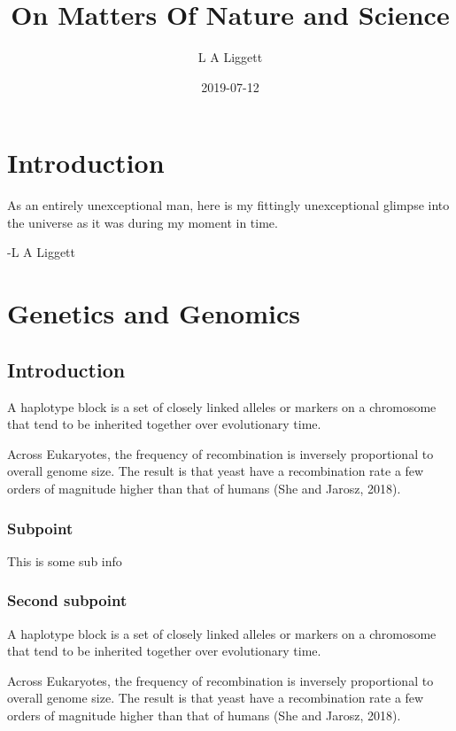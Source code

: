 \documentclass[]{book}
\title{On Matters Of Nature and Science}
\author{L A Liggett}
\date{2019-07-12}
\begin{document}
\maketitle

{
\setcounter{tocdepth}{1}
\tableofcontents
}
\chapter{Introduction}\label{introduction}

As an entirely unexceptional man, here is my fittingly unexceptional
glimpse into the universe as it was during my moment in time.

-L A Liggett

\chapter{Genetics and Genomics}\label{g2}

\section{Introduction}\label{introduction-1}

A haplotype block is a set of closely linked alleles or markers on a
chromosome that tend to be inherited together over evolutionary time.

Across Eukaryotes, the frequency of recombination is inversely
proportional to overall genome size. The result is that yeast have a
recombination rate a few orders of magnitude higher than that of humans
(She and Jarosz, 2018).

\subsection{Subpoint}\label{subpoint}

This is some sub info

\subsection{Second subpoint}\label{second-subpoint}

A haplotype block is a set of closely linked alleles or markers on a
chromosome that tend to be inherited together over evolutionary time.

Across Eukaryotes, the frequency of recombination is inversely
proportional to overall genome size. The result is that yeast have a
recombination rate a few orders of magnitude higher than that of humans
(She and Jarosz, 2018).
\end{document}
